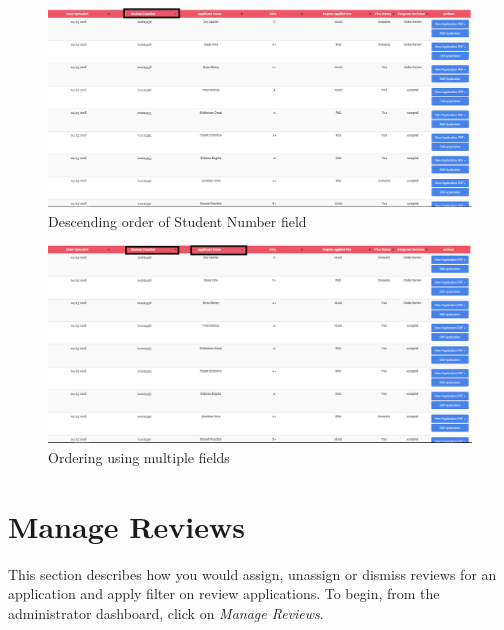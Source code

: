 \documentclass[fontsize=12pt,paper=letter,twoside]{scrartcl}
\begin{document}
\begin{figure}[!htb]
\begin{center}
\includegraphics[width=.99\textwidth]{images/ma/order_descending.png}
\end{center}
\caption{Descending order of Student Number field}
\label{fig:order_descending}
\end{figure}

\newpage

\begin{figure}[!htb]
\begin{center}
\includegraphics[width=.99\textwidth]{images/ma/multiple_order.png}
\end{center}
\caption{Ordering using multiple fields}
\label{fig:multiple_order}
\end{figure}


\newpage
\clearpage
\section{Manage Reviews} \label{m_reviews}
This section describes how you would assign, unassign or dismiss reviews for an application and apply filter on review applications. To begin, from the administrator dashboard, click on \emph{Manage Reviews}.
\end{document}
